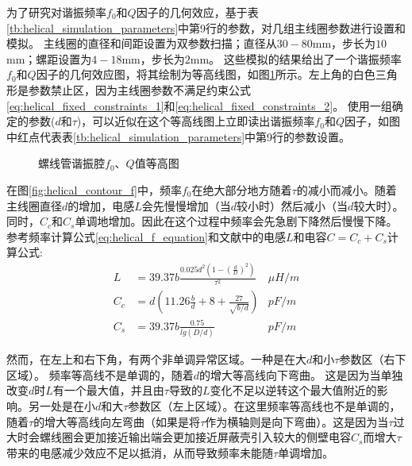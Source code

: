 为了研究对谐振频率$f_0$和$Q$因子的几何效应，基于表\ref{tb:helical_simulation_parameters}中第9行的参数，对几组主线圈参数进行设置和模拟。
主线圈的直径和间距设置为双参数扫描；直径从$30-80$mm，步长为$10$mm；螺距设置为$4-18$mm，步长为$2$mm。
这些模拟的结果给出了一个谐振频率$f_0$和$Q$因子的几何效应图，将其绘制为等高线图，如图\ref{fig:helical_contour}所示。左上角的白色三角形是参数禁止区，因为主线圈参数不满足约束公式\eqref{eq:helical_fixed_constraints_1}和\eqref{eq:helical_fixed_constraints_2}。
使用一组确定的参数($d$和$\tau$)，可以近似在这个等高线图上立即读出谐振频率$f_0$和$Q$因子，如图中红点代表表\ref{tb:helical_simulation_parameters}中第9行的参数设置。

\begin{figure}
    \centering
    \caption[螺线管谐振腔$f_0$、$Q$值等高图]{螺线管谐振腔$f_0$、$Q$值等高图\label{fig:helical_contour}}
\end{figure}

在图\ref{fig:helical_contour_f}中，频率$f_0$在绝大部分地方随着$\tau$的减小而减小。随着主线圈直径$d$的增加，电感$L$会先慢慢增加（当$d$较小时）然后减小（当$d$较大时）。同时，$C_c$和$C_s$单调地增加。因此在这个过程中频率会先急剧下降然后慢慢下降。参考频率计算公式\eqref{eq:helical_f_equation}和文献\cite[]{Siverns_Simkins_Weidt_Hensinger_2012,Macalpine_Schildknecht_1959}中的电感$L$和电容$C = C_c +C_s$计算公式:
\begin{align}
    L&=39.37b\frac{0.025d^2(1-(\frac{d}{D})^2)}{\tau^2} &\mu H/m \label{eq:helical_L} \\
	C_c&=d(11.26\frac{b}{d}+8+\frac{27}{\sqrt{b/d}})  &pF/m \label{eq:helical_C_c}\\
	C_s&=39.37b\frac{0.75}{lg(D/d)} &pF/m \label{eq:helical_C_s}
\end{align}

然而，在左上和右下角，有两个非单调异常区域。一种是在大$d$和小$\tau$参数区（右下区域）。
频率等高线不是单调的，随着$d$的增大等高线向下弯曲。
这是因为当单独改变$d$时$L$有一个最大值，并且由$\tau$导致的$L$变化不足以逆转这个最大值附近的影响。另一处是在小$d$和大$\tau$参数区（左上区域）。在这里频率等高线也不是单调的，随着$\tau$的增大等高线向左弯曲（如果是将$\tau$作为横轴则是向下弯曲）。这是因为当$\tau$过大时会螺线圈会更加接近输出端会更加接近屏蔽壳引入较大的侧壁电容$C_s$而增大$\tau$带来的电感减少效应不足以抵消，从而导致频率未能随$\tau$单调增加。

